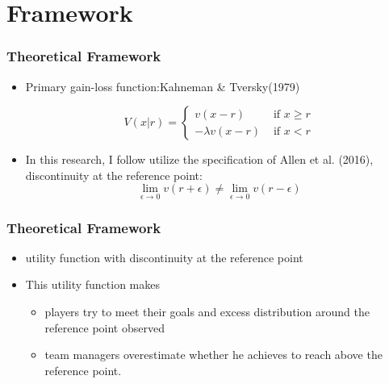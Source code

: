 \documentclass[dvipdfmx,12pt]{beamer}
\begin{document}
\section{Framework}
\begin{frame}\frametitle{Theoretical Framework}
  \begin{itemize}
    \item Primary gain-loss function:Kahneman \& Tversky(1979)

    \[ V(x|r) = \begin{cases}
    v(x - r) & \text{ if } x \geq r \\
    - \lambda v (x - r) & \text{ if } x < r
    \end{cases} \]

   \item In this research, I follow utilize the specification
   of Allen et al. (2016), discontinuity at the reference point:
   \[ \lim_{\epsilon \to 0} v(r + \epsilon) \neq
   \lim_{\epsilon \to 0} v(r - \epsilon)
   \]
  \end{itemize}
\end{frame}

\begin{frame}\frametitle{Theoretical Framework}
 \begin{itemize}
   \item utility function with discontinuity at the reference point
  \item This utility function makes
  \begin{itemize}
    \item players try to meet their goals and excess distribution around the reference
    point observed
    \item team managers overestimate whether he achieves to reach above the
    reference point.
  \end{itemize}
 \end{itemize}

\end{frame}
\end{document}
